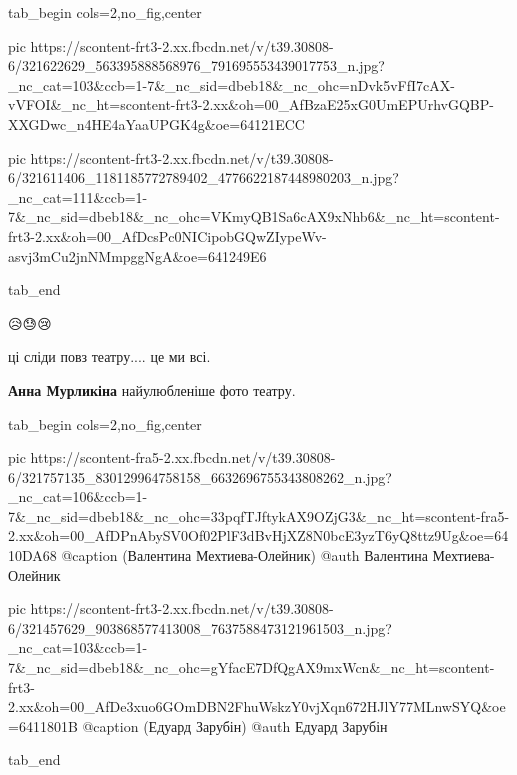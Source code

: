 \begin{center}
\begin{minipage}{\textwidth}

\ifcmt
  tab_begin cols=2,no_fig,center

     pic https://scontent-frt3-2.xx.fbcdn.net/v/t39.30808-6/321622629_563395888568976_791695553439017753_n.jpg?_nc_cat=103&ccb=1-7&_nc_sid=dbeb18&_nc_ohc=nDvk5vFfI7cAX-vVFOI&_nc_ht=scontent-frt3-2.xx&oh=00_AfBzaE25xG0UmEPUrhvGQBP-XXGDwc_n4HE4aYaaUPGK4g&oe=64121ECC

     pic https://scontent-frt3-2.xx.fbcdn.net/v/t39.30808-6/321611406_1181185772789402_4776622187448980203_n.jpg?_nc_cat=111&ccb=1-7&_nc_sid=dbeb18&_nc_ohc=VKmyQB1Sa6cAX9xNhb6&_nc_ht=scontent-frt3-2.xx&oh=00_AfDcsPc0NICipobGQwZIypeWv-asvj3mCu2jnNMmpggNgA&oe=641249E6

  tab_end
\fi
\end{minipage}
\end{center}


😥😓😢


ці сліди повз театру.... це ми всі.

\begin{itemize} %
\textbf{Анна Мурликіна} найулюбленіше фото театру.
\end{itemize} %

\begin{center}
\begin{minipage}{\textwidth}

\ifcmt
  tab_begin cols=2,no_fig,center

     pic https://scontent-fra5-2.xx.fbcdn.net/v/t39.30808-6/321757135_830129964758158_6632696755343808262_n.jpg?_nc_cat=106&ccb=1-7&_nc_sid=dbeb18&_nc_ohc=33pqfTJftykAX9OZjG3&_nc_ht=scontent-fra5-2.xx&oh=00_AfDPnAbySV0Of02PlF3dBvHjXZ8N0bcE3yzT6yQ8ttz9Ug&oe=6410DA68
     @caption (Валентина Мехтиева-Олейник)
     @auth Валентина Мехтиева-Олейник

     pic https://scontent-frt3-2.xx.fbcdn.net/v/t39.30808-6/321457629_903868577413008_7637588473121961503_n.jpg?_nc_cat=103&ccb=1-7&_nc_sid=dbeb18&_nc_ohc=gYfacE7DfQgAX9mxWcn&_nc_ht=scontent-frt3-2.xx&oh=00_AfDe3xuo6GOmDBN2FhuWskzY0vjXqn672HJlY77MLnwSYQ&oe=6411801B
     @caption (Едуард Зарубін)
     @auth Едуард Зарубін

  tab_end
\fi
\end{minipage}
\end{center}

